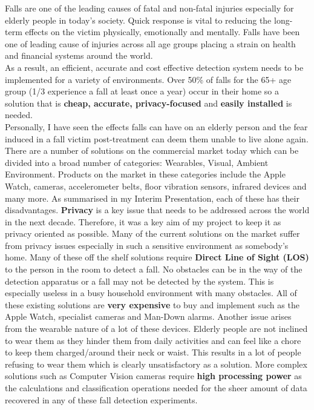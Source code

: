 Falls are one of the leading causes of fatal and non-fatal injuries especially for elderly people in today's society. Quick response is vital to reducing the long-term effects on the victim physically, emotionally and mentally. Falls have been one of leading cause of injuries across all age groups placing a strain on health and financial systems around the world. \\
As a result, an efficient, accurate and cost effective detection system needs to be implemented for a variety of environments. Over 50\% of falls for the 65+ age group (1/3 experience a fall at least once a year) occur in their home so a solution that is \textbf{cheap, accurate, privacy-focused} and \textbf{easily installed} is needed. \\
Personally, I have seen the effects falls can have on an elderly person and the fear induced in a fall victim post-treatment can deem them unable to live alone again. \\
There are a number of solutions on the commercial market today which can be divided into a broad number of categories: Wearables, Visual, Ambient Environment. Products on the market in these categories include the Apple Watch, cameras, accelerometer belts, floor vibration sensors, infrared devices and many more. As summarised in my Interim Presentation, each of these has their disadvantages. \textbf{Privacy} is a key issue that needs to be addressed across the world in the next decade. Therefore, it was a key aim of my project to keep it as privacy oriented as possible. Many of the current solutions on the market suffer from privacy issues especially in such a sensitive environment as somebody's home. Many of these off the shelf solutions require \textbf{Direct Line of Sight (LOS)} to the person in the room to detect a fall. No obstacles can be in the way of the detection apparatus or a fall may not be detected by the system. This is especially useless in a busy household environment with many obstacles. All of these existing solutions are \textbf{very expensive} to buy and implement such as the Apple Watch, specialist cameras and Man-Down alarms. Another issue arises from the wearable nature of a lot of these devices. Elderly people are not inclined to wear them as they hinder them from daily activities and can feel like a chore to keep them charged/around their neck or waist. This results in a lot of people refusing to wear them which is clearly unsatisfactory as a solution. More complex solutions such as Computer Vision cameras require \textbf{high processing power} as the calculations and classification operations needed for the sheer amount of data recovered in any of these fall detection experiments. \\
